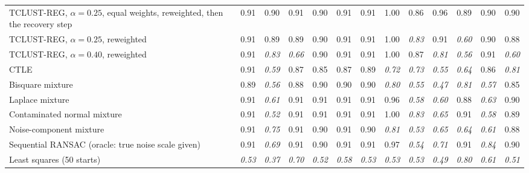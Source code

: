 \begin{table}[!tb]
{\begin{tabular}{lcccccccccccc}
TCLUST-REG, $\alpha=0.25$, equal weights, reweighted, then the recovery step & 0.91 & 0.90 & 0.91 & 0.90 & 0.91 & 0.91 & 1.00 & 0.86 & 0.96 & 0.89 & 0.90 & 0.90 \\
TCLUST-REG, $\alpha=0.25$, reweighted & 0.91 & 0.89 & 0.89 & 0.90 & 0.91 & 0.91 & 1.00 & \textit{0.83} & 0.91 & \textit{0.60} & 0.90 & 0.88 \\
TCLUST-REG, $\alpha=0.40$, reweighted & 0.91 & \textit{0.83} & \textit{0.66} & 0.90 & 0.91 & 0.91 & 1.00 & 0.87 & \textit{0.81} & \textit{0.56} & 0.91 & \textit{0.60} \\
\addlinespace
CTLE & 0.91 & \textit{0.59} & 0.87 & 0.85 & 0.87 & 0.89 & \textit{0.72} & \textit{0.73} & \textit{0.55} & \textit{0.64} & 0.86 & \textit{0.81} \\
Bisquare mixture & 0.89 & \textit{0.56} & 0.88 & 0.90 & 0.90 & 0.90 & \textit{0.80} & \textit{0.55} & \textit{0.47} & \textit{0.81} & \textit{0.57} & 0.85 \\
Laplace mixture & 0.91 & \textit{0.61} & 0.91 & 0.91 & 0.91 & 0.91 & 0.96 & \textit{0.58} & \textit{0.60} & 0.88 & \textit{0.63} & 0.90 \\
Contaminated normal mixture & 0.91 & \textit{0.52} & 0.91 & 0.91 & 0.91 & 0.91 & 1.00 & \textit{0.83} & \textit{0.65} & 0.91 & \textit{0.58} & 0.89 \\
Noise-component mixture & 0.91 & \textit{0.75} & 0.91 & 0.90 & 0.91 & 0.90 & \textit{0.81} & \textit{0.53} & \textit{0.65} & \textit{0.64} & \textit{0.61} & 0.88 \\
Sequential RANSAC (oracle: true noise scale given) & 0.91 & \textit{0.69} & 0.91 & 0.90 & 0.91 & 0.91 & 0.97 & \textit{0.54} & \textit{0.71} & 0.91 & \textit{0.84} & 0.90 \\
Least squares (50 starts) & \textit{0.53} & \textit{0.37} & \textit{0.70} & \textit{0.52} & \textit{0.58} & \textit{0.53} & \textit{0.53} & \textit{0.53} & \textit{0.49} & \textit{0.80} & \textit{0.61} & \textit{0.51} \\
\bottomrule
\end{tabular}}
\end{table}